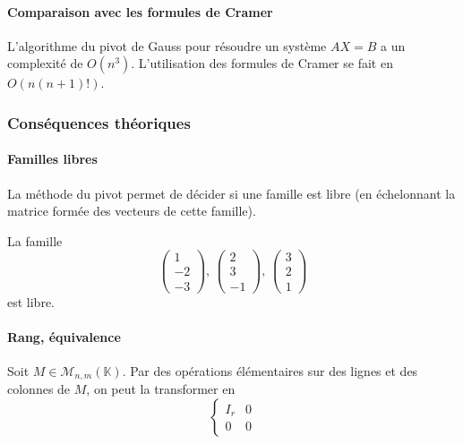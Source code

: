 	\paragraph{Comparaison avec les formules de Cramer}
	
	
	\begin{theorem}
		L'algorithme du pivot de Gauss pour résoudre un système $AX = B$ a un complexité de $O(n^3)$. L'utilisation des formules de Cramer se fait en $O(n(n+1)!)$.
	\end{theorem}
	
	\subsubsection{Conséquences théoriques}
	
	\paragraph{Familles libres}
	
	
	\begin{proposition}
		La méthode du pivot permet de décider si une famille est libre (en échelonnant la matrice formée des vecteurs de cette famille).
	\end{proposition}
	
	\begin{example}
		La famille
		\[ \begin{pmatrix} 1 \\ -2 \\ -3 \end{pmatrix}, \, \begin{pmatrix} 2 \\ 3 \\ -1 \end{pmatrix}, \, \begin{pmatrix} 3 \\ 2 \\ 1 \end{pmatrix} \]
		est libre.
	\end{example}
	
	\paragraph{Rang, équivalence}
	
	
	\begin{proposition}
		Soit $M \in \mathcal{M}_{n,m}(\mathbb{K})$. Par des opérations élémentaires sur des lignes et des colonnes de $M$, on peut la transformer en
		\[
			\begin{cases}
				I_r & 0 \\
				0 & 0
			\end{cases}
		\]
	\end{proposition}
	
